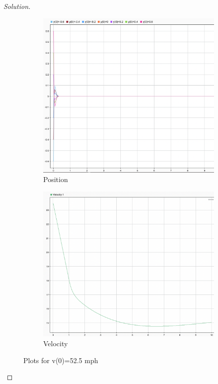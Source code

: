 \documentclass{article}
\begin{document}
\begin{proof}[Solution]
  \begin{figure}[h!]
    \centering
    \begin{subfigure}{0.4\linewidth}
      \includegraphics[width=\linewidth]{img20.png}
      \caption{Position}
    \end{subfigure}
    \begin{subfigure}{0.4\linewidth}
      \includegraphics[width=\linewidth]{img21.png}
      \caption{Velocity}
    \end{subfigure}
    \caption{Plots for v(0)=52.5 mph}
\end{figure}


\end{proof}
\end{document}
